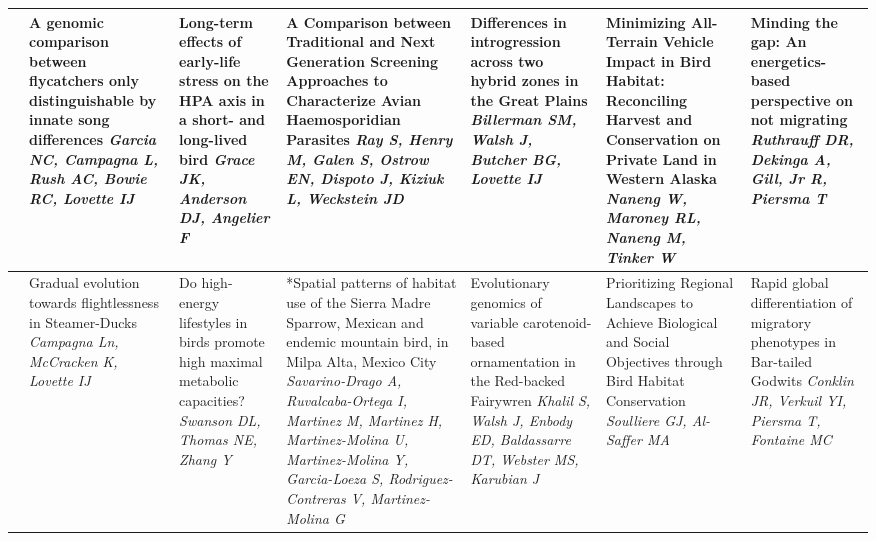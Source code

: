 \begin{tabular}{|x{0.75cm}|x{2.25cm}|x{2.25cm}|a{2.25cm}|a{2.25cm}|a{2.25cm}|a{2.25cm}|}
\hline
{}&A genomic comparison between flycatchers only distinguishable by innate song differences \newline \newline \textit{Garcia NC, Campagna L, Rush AC, Bowie RC, Lovette IJ} & Long-term effects of early-life stress on the HPA axis in a short- and long-lived bird \newline \newline \textit{Grace JK, Anderson DJ, Angelier F} & A Comparison between Traditional and Next Generation Screening Approaches to Characterize Avian Haemosporidian Parasites \newline \newline \textit{Ray S, Henry M, Galen S, Ostrow EN, Dispoto J, Kiziuk L, Weckstein JD} & Differences in introgression across two hybrid zones in the Great Plains \newline \newline \textit{Billerman SM, Walsh J, Butcher BG, Lovette IJ} & Minimizing All-Terrain Vehicle Impact in Bird Habitat: Reconciling Harvest and Conservation on Private Land in Western Alaska \newline \newline \textit{Naneng W, Maroney RL, Naneng M, Tinker W} & Minding the gap: An energetics-based perspective on not migrating \newline \newline \textit{Ruthrauff DR, Dekinga A, Gill, Jr R, Piersma T}\\
\hline
{}&Gradual evolution towards flightlessness in Steamer-Ducks \newline \newline \textit{Campagna Ln, McCracken K, Lovette IJ} & Do high-energy lifestyles in birds promote high maximal metabolic capacities? \newline \newline \textit{Swanson DL, Thomas NE, Zhang Y} & *Spatial patterns of habitat use of the Sierra Madre Sparrow, Mexican and endemic mountain bird, in Milpa Alta, Mexico City \newline \newline \textit{Savarino-Drago A, Ruvalcaba-Ortega I, Martinez M, Martinez H, Martinez-Molina U, Martinez-Molina Y, Garcia-Loeza S, Rodriguez-Contreras V, Martinez-Molina G} & Evolutionary genomics of variable carotenoid-based ornamentation in the Red-backed Fairywren \newline \newline \textit{Khalil S, Walsh J, Enbody ED, Baldassarre DT, Webster MS, Karubian J} & Prioritizing Regional Landscapes to Achieve Biological and Social Objectives through Bird Habitat Conservation \newline \newline \textit{Soulliere GJ, Al-Saffer MA} & Rapid global differentiation of migratory phenotypes in Bar-tailed Godwits \newline \newline \textit{Conklin JR, Verkuil YI, Piersma T, Fontaine MC}\\

\end{tabular}
